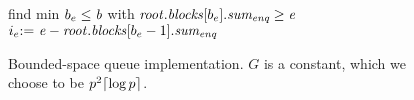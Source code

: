 \begin{figure*}
\begin{minipage}[t]{0.56\textwidth}
\begin{algorithmic}[1]
		\State find min $b_e \leq \mbox{\textnormal{\textit{b}}}$ with $\mbox{\textnormal{\textit{root}}}.\mbox{\textit{blocks}}[b_e].\mbox{\textit{sum\textsubscript{enq}}} \geq \mbox{\textnormal{\textit{e}}}$\label{FRsearchGC} 
		\State $i_e \mbox{:=}\ \mbox{\textnormal{\textit{e}}} - \mbox{\textnormal{\textit{root}}}.\mbox{\textit{blocks}}[b_e-1].\mbox{\textit{sum\textsubscript{enq}}}$ 
    \EndIf
{}

\end{algorithmic}
\end{minipage}
\vspace*{-4mm}
\caption{Bounded-space queue implementation.\label{pseudocode1GC}  $G$ is a constant, which we choose to be $p^2 \lceil \log p \rceil$.}
\end{figure*}

